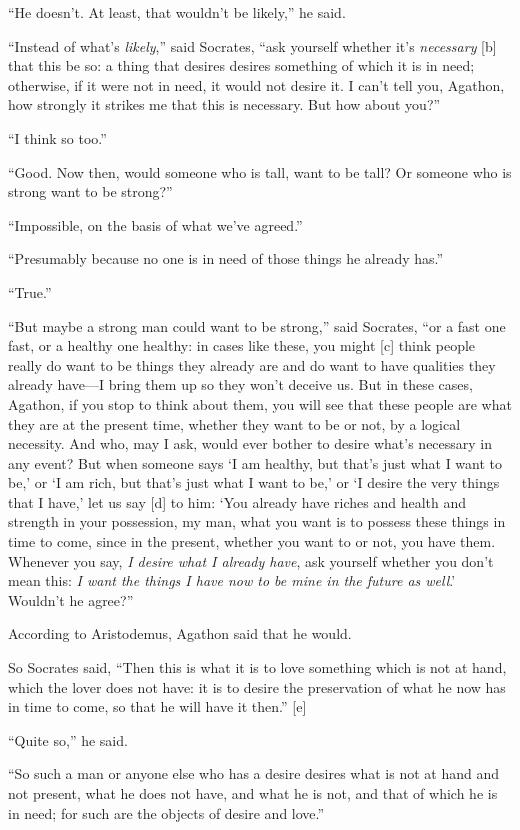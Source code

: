 “He doesn't. At least, that wouldn't be likely,” he said.

“Instead of what's {\em likely},” said Socrates, “ask yourself whether
it's {\em necessary} {[}b{]} that this be so: a thing that desires
desires something of which it is in need; otherwise, if it were not in
need, it would not desire it. I can't tell you, Agathon, how strongly it
strikes me that this is necessary. But how about you?”

“I think so too.”

“Good. Now then, would someone who is tall, want to be tall? Or someone
who is strong want to be strong?”

“Impossible, on the basis of what we've agreed.”

“Presumably because no one is in need of those things he already has.”

“True.”

“But maybe a strong man could want to be strong,” said Socrates, “or a
fast one fast, or a healthy one healthy: in cases like these, you might
{[}c{]} think people really do want to be things they already are and do
want to have qualities they already have---I bring them up so they won't
deceive us. But in these cases, Agathon, if you stop to think about
them, you will see that these people are what they are at the present
time, whether they want to be or not, by a logical necessity. And who,
may I ask, would ever bother to desire what's necessary in any event?
But when someone says ‘I am healthy, but that's just what I want to be,'
or ‘I am rich, but that's just what I want to be,' or ‘I desire the very
things that I have,' let us say {[}d{]} to him: ‘You already have riches
and health and strength in your possession, my man, what you want is to
possess these things in time to come, since in the present, whether you
want to or not, you have them. Whenever you say, {\em I desire what I
already have}, ask yourself whether you don't mean this: {\em I want the
things I have now to be mine in the future as well}.' Wouldn't he
agree?”

According to Aristodemus, Agathon said that he would.

So Socrates said, “Then this is what it is to love something which is
not at hand, which the lover does not have: it is to desire the
preservation of what he now has in time to come, so that he will have it
then.” {[}e{]}

“Quite so,” he said.

“So such a man or anyone else who has a desire desires what is not at
hand and not present, what he does not have, and what he is not, and
that of which he is in need; for such are the objects of desire and
love.”

